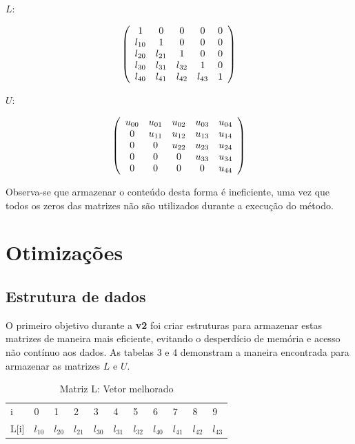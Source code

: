 \documentclass[12pt]{article}
\begin{document}
$L$:

$$ \left(
  \begin{array}{c c c c c}
     1       & 0      & 0      & 0      & 0\\
     l_{10}  & 1      & 0      & 0      & 0\\
     l_{20}  & l_{21} & 1      & 0      & 0\\
     l_{30}  & l_{31} & l_{32} & 1      & 0\\
     l_{40}  & l_{41} & l_{42} & l_{43} & 1 \\
  \end{array} \right)
$$

$U$:

$$ \left(
  \begin{array}{c c c c c}
     u_{00}  & u_{01}    & u_{02} & u_{03}  & u_{04}\\
     0       & u_{11}    & u_{12} & u_{13}  & u_{14}\\
     0       & 0         & u_{22} & u_{23}  & u_{24}\\
     0       & 0         & 0      & u_{33}  & u_{34}\\
     0       & 0         & 0      & 0       & u_{44} \\
  \end{array} \right)
$$

Observa-se que armazenar o conteúdo desta forma é ineficiente, uma vez que todos os zeros das matrizes não são utilizados durante a execução do método.

\section{Otimizações}
\subsection{Estrutura de dados}
O primeiro objetivo durante a \textbf{v2} foi criar estruturas para armazenar estas matrizes de maneira mais eficiente, evitando o desperdício de memória e acesso não contínuo aos dados. As tabelas 3 e 4 demonstram a maneira encontrada para armazenar as matrizes $L$ e $U$.

\begin{table}[H]
\centering
\caption{Matriz L: Vetor melhorado}
\label{my-label}
\begin{tabular}{l|l|l|l|l|l|l|l|l|l|l|}
\cline{2-11}
i   & 0      & 1      & 2      & 3      & 4      & 5      & 6      & 7      & 8      & 9   \\ \cline{2-11}
L[i] & $l_{10}$ & $l_{20}$ & $l_{21}$ & $l_{30}$ & $l_{31}$ & $l_{32}$ & $l_{40}$ & $l_{41}$ & $l_{42}$ & $l_{43}$ \\ \cline{2-11}
\end{tabular}
\end{table}
\end{document}
